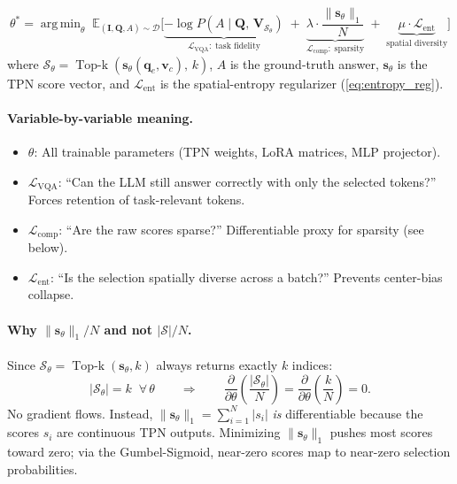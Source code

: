 \documentclass[11pt,a4paper]{article}
\DeclareMathOperator*{\argmin}{arg\,min}
\DeclareMathOperator{\TopK}{Top\text{-}k}
\newcommand{\E}{\mathbb{E}}
\newcommand{\vc}{\mathbf{v}_c}
\newcommand{\qe}{\mathbf{q}_e}
\newcommand{\vs}{\mathbf{s}}
\newcommand{\mI}{\mathbf{I}}
\newcommand{\mQ}{\mathbf{Q}}
\newcommand{\mV}{\mathbf{V}}
\begin{document}
\begin{definitionbox}[title={TC-ViTok Training Objective}]
\begin{equation}
  \theta^* = \argmin_{\theta} \;
    \E_{(\mI,\mQ,A)\sim\mathcal{D}} \Big[
      \underbrace{
        -\log P\!\left(A \mid \mQ,\,\mV_{\mathcal{S}_\theta}\right)
      }_{\mathcal{L}_{\text{VQA}}:\;\text{task fidelity}}
      \;+\; \underbrace{
        \lambda \cdot \frac{\lVert \vs_\theta \rVert_1}{N}
      }_{\mathcal{L}_{\text{comp}}:\;\text{sparsity}}
      \;+\; \underbrace{
        \mu \cdot \mathcal{L}_{\text{ent}}
      }_{\text{spatial diversity}}
    \Big]
  \label{eq:objective}
\end{equation}
where $\mathcal{S}_\theta = \TopK(\vs_\theta(\qe,\vc),\, k)$,
$A$ is the ground-truth answer, $\vs_\theta$ is the TPN score vector,
and $\mathcal{L}_{\text{ent}}$ is the spatial-entropy regularizer
(\cref{eq:entropy_reg}).
\end{definitionbox}

\paragraph{Variable-by-variable meaning.}
\begin{itemize}[leftmargin=1.5em, itemsep=1pt]
  \item $\theta$: All trainable parameters (TPN weights, LoRA matrices,
    MLP projector).
  \item $\mathcal{L}_{\text{VQA}}$: ``Can the LLM still answer correctly
    with only the selected tokens?'' Forces retention of task-relevant
    tokens.
  \item $\mathcal{L}_{\text{comp}}$: ``Are the raw scores sparse?''
    Differentiable proxy for sparsity (see below).
  \item $\mathcal{L}_{\text{ent}}$: ``Is the selection spatially diverse
    across a batch?'' Prevents center-bias collapse.
\end{itemize}

\paragraph{Why $\lVert\vs_\theta\rVert_1/N$ and not $|\mathcal{S}|/N$.}
Since $\mathcal{S}_\theta = \TopK(\vs_\theta, k)$ always returns exactly
$k$ indices:
\begin{equation}
  |\mathcal{S}_\theta| = k \;\; \forall\, \theta
  \qquad \Longrightarrow \qquad
  \frac{\partial}{\partial \theta}\!\left(\frac{|\mathcal{S}_\theta|}{N}\right)
  = \frac{\partial}{\partial \theta}\!\left(\frac{k}{N}\right) = 0.
\end{equation}
No gradient flows. Instead, $\|\vs_\theta\|_1 = \sum_{i=1}^{N} |s_i|$
\emph{is} differentiable because the scores $s_i$ are continuous TPN
outputs. Minimizing $\|\vs_\theta\|_1$ pushes most scores toward zero;
via the Gumbel-Sigmoid, near-zero scores map to near-zero selection
probabilities.
\end{document}
